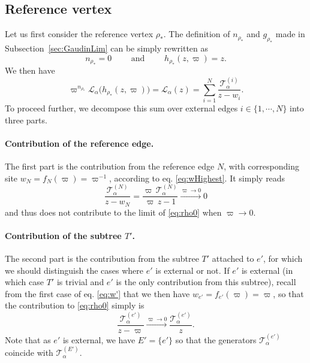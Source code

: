 \documentclass{article}
\def\Lc{\mathcal{L}}
\begin{document}
\subsection{Reference vertex}

Let us first consider the reference vertex $\rho_\ast$. The definition of $n_{\rho_\ast}$ and $g_{\rho_\ast}$ made in Subsection~\ref{sec:GaudinLim} can be simply rewritten as
\begin{equation}
n_{\rho_\ast} = 0 \qquad \text{ and } \qquad h_{\rho_\ast}(z,\varpi) = z.
\end{equation}
We then have
\begin{equation}\label{eq:rho0}
\varpi^{n_{\rho_\ast}} \Lc_\alpha \bigl( h_{\rho_\ast}(z,\varpi) \bigr) = \Lc_\alpha(z) = \sum_{i=1}^N \frac{\mathcal{T}_\alpha^{(i)}}{z-w_i}.
\end{equation}
To proceed further, we decompose this sum over external edges $i\in \lbrace 1,\cdots,N\rbrace$ into three parts.

\paragraph{Contribution of the reference edge.} The first part is the contribution from the reference edge $N$, with corresponding site $w_N=f_N(\varpi)=\varpi^{-1}$, according to eq. \eqref{eq:wHighest}. It simply reads
\begin{equation}\label{eq:ContribN}
\frac{\mathcal{T}_\alpha^{(N)}}{z-w_N} = \frac{\varpi \,\mathcal{T}_\alpha^{(N)}}{\varpi \, z - 1} \xrightarrow{\varpi\to 0} 0
\end{equation}
and thus does not contribute to the limit of \eqref{eq:rho0} when $\varpi\to 0$.

\paragraph{Contribution of the subtree $T'$.} The second part is the contribution from the subtree $T'$ attached to $e'$, for which we should distinguish the cases where $e'$ is external or not. If $e'$ is external (in which case $T'$ is trivial and $e'$ is the only contribution from this subtree), recall from the first case of eq. \eqref{eq:w'} that we then have $w_{e'}=f_{e'}(\varpi)=\varpi$, so that the contribution to \eqref{eq:rho0} simply is
\begin{equation}\label{eq:Contribe'}
\frac{\mathcal{T}_\alpha^{(e')}}{z-\varpi} \xrightarrow{\varpi\to 0} \frac{\mathcal{T}_\alpha^{(e')}}{z}.
\end{equation}
Note that as $e'$ is external, we have $E'=\lbrace e' \rbrace$ so that the generators $\mathcal{T}_\alpha^{(e')}$ coincide with $\mathcal{T}_\alpha^{(E')}$.
\end{document}

